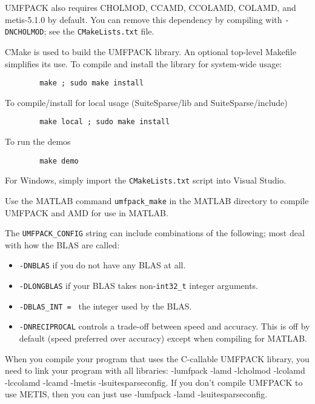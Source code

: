 \documentclass[11pt]{article}
\begin{document}
UMFPACK also requires CHOLMOD, CCAMD, CCOLAMD, COLAMD, and metis-5.1.0
by default.  You can remove this dependency by compiling with
{\tt -DNCHOLMOD}; see the \verb'CMakeLists.txt' file.

CMake is used to build the UMFPACK library.  An optional top-level Makefile
simplifies its use.  To compile and install the library for system-wide usage:

\begin{verbatim}
        make ; sudo make install
\end{verbatim}

    To compile/install for local usage (SuiteSparse/lib and SuiteSparse/include)

\begin{verbatim}
        make local ; sudo make install
\end{verbatim}

    To run the demos

\begin{verbatim}
        make demo
\end{verbatim}

For Windows, simply import the \verb'CMakeLists.txt' script into Visual Studio.

Use the MATLAB command {\tt umfpack\_make} in the MATLAB directory
to compile UMFPACK and AMD for use in MATLAB.

The {\tt UMFPACK\_CONFIG} string can include combinations of the following;
most deal with how the BLAS are called:
\begin{itemize}
\item {\tt -DNBLAS} if you do not have any BLAS at all.
\item {\tt -DLONGBLAS} if your BLAS takes non-\verb'int32_t' integer arguments.
\item {\tt -DBLAS\_INT = } the integer used by the BLAS.

\item {\tt -DNRECIPROCAL} controls a trade-off between speed and accuracy.
    This is off by default (speed preferred over accuracy) except when
    compiling for MATLAB.
\end{itemize}

When you compile your program that uses the C-callable UMFPACK library,
you need to link your program with all libraries:
-lumfpack -lamd -lcholmod -lcolamd -lccolamd -lcamd -lmetis -lsuitesparseconfig.
If you don't compile UMFPACK to use METIS, then you can  just use
-lumfpack -lamd -lsuitesparseconfig.
\end{document}
